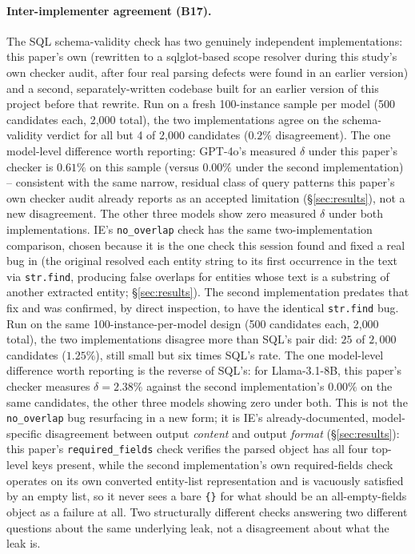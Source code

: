 \documentclass[11pt]{article}
\begin{document}
\paragraph{Inter-implementer agreement (B17).} The SQL schema-validity
check has two genuinely independent implementations: this paper's own
(rewritten to a sqlglot-based scope resolver during this study's own
checker audit, after four real parsing defects were found in an earlier
version) and a second, separately-written codebase built for an earlier
version of this project before that rewrite. Run on a fresh 100-instance
sample per model (500 candidates each, 2{,}000 total), the two
implementations agree on the schema-validity verdict for all but 4 of
2{,}000 candidates ($0.2\%$ disagreement). The one model-level difference
worth reporting: GPT-4o's measured $\delta$ under this paper's checker is
$0.61\%$ on this sample (versus $0.00\%$ under the second implementation)
-- consistent with the same narrow, residual class of query patterns this
paper's own checker audit already reports as an accepted limitation
(\S\ref{sec:results}), not a new disagreement. The other three models show
zero measured $\delta$ under both implementations. IE's \texttt{no\_overlap} check
has the same two-implementation comparison, chosen because it is the one
check this session found and fixed a real bug in (the original resolved
each entity string to its first occurrence in the text via
\texttt{str.find}, producing false overlaps for entities whose text is a
substring of another extracted entity; \S\ref{sec:results}). The second
implementation predates that fix and was confirmed, by direct
inspection, to have the identical \texttt{str.find} bug. Run on the same
100-instance-per-model design (500 candidates each, 2{,}000 total), the
two implementations disagree more than SQL's pair did: $25$ of $2{,}000$
candidates ($1.25\%$), still small but six times SQL's rate. The one
model-level difference worth reporting is the reverse of SQL's: for
Llama-3.1-8B, this paper's checker measures $\delta=2.38\%$ against the
second implementation's $0.00\%$ on the same candidates, the other three
models showing zero under both. This is not the \texttt{no\_overlap} bug
resurfacing in a new form; it is IE's already-documented, model-specific
disagreement between output \emph{content} and output \emph{format}
(\S\ref{sec:results}): this paper's \texttt{required\_fields} check
verifies the parsed object has all four top-level keys present, while
the second implementation's own required-fields check operates on its
own converted entity-list representation and is vacuously satisfied by
an empty list, so it never sees a bare \texttt{\{\}} for what should be
an all-empty-fields object as a failure at all. Two structurally
different checks answering two different questions about the same
underlying leak, not a disagreement about what the leak is.
\end{document}
